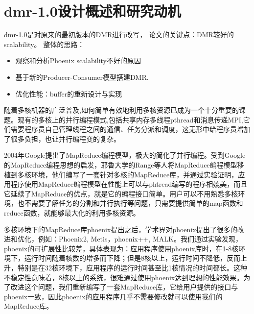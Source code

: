 \section{dmr-1.0设计概述和研究动机}
dmr-1.0是对原来的最初版本的DMR进行改写，
论文的关键点：DMR较好的scalability。
整体的思路：
\begin{itemize}
  \item 观察和分析Phoenix scalability不好的原因
  \item 基于新的Producer-Consumer模型搭建DMR.
  \item 优化性能：buffer的重新设计与实现
\end{itemize}


随着多核机器的广泛普及,如何简单有效地利用多核资源已成为一个十分重要的课题。现有的多核上的并行编程模式,包括共享内存多线程pthread和消息传递MPI,它们需要程序员自己管理线程之间的通信、任务分派和调度，这无形中给程序员增加了很多负担，也让并行编程变的复杂。

2004年Google提出了MapReduce编程模型，极大的简化了并行编程。受到Google的MapReduce编程思想的启发，耶鲁大学的Range等人将MapReduce编程模型移植到多核环境，他们编写了一套针对多核的MapReduce库，并通过实验证明，应用程序使用MapReduce编程模型在性能上可以与phtread编写的程序相媲美，而且它延续了MapReduce的优点，就是它的编程接口简单。用户可以不用熟悉多核环境，也不需要了解任务的分割和并行执行等问题，只需要提供简单的map函数和reduce函数，就能够最大化的利用多核资源。

多核环境下的MapReduce库phoenix提出之后，学术界对phoenix提出了很多的改进和优化，例如：Phoenix2, Metis，phoenix++, MALK。我们通过实验发现，phoenix的可扩展性比较差，具体表现为：应用程序使用phoenix库时，在1-8核环境下，运行时间随着核数的增多而下降；但是8核以上，运行时间不降低，反而上升，特别是在32核环境下，应用程序的运行时间甚至比1核情况的时间都长。这种不稳定性意味着，8核以上的系统，很难通过使用phoenix达到理想的性能效果。为了改进这个问题，我们重新编写了一套MapReduce库，它给用户提供的接口与phoenix一致，因此phoenix的应用程序几乎不需要修改就可以使用我们的MapReduce库。

